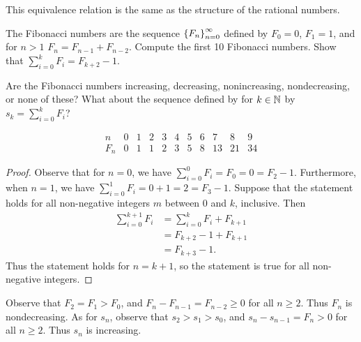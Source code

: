 \documentclass{article}
\begin{document}
  This equivalence relation is the same as the structure of the rational numbers.
  \newpage
  \begin{problem}{4}
    The Fibonacci numbers are the sequence $\left\{F_n\right\}^\infty_{n=0}$ defined by $F_0 = 0$, $F_1 = 1$, and for $n > 1$ $F_n = F_{n-1} + F_{n-2}$. Compute the first 10 Fibonacci numbers. Show that $\sum_{i=0}^{k}F_i = F_{k+2}-1$.\par
    Are the Fibonacci numbers increasing, decreasing, nonincreasing, nondecreasing, or none of these? What about the sequence defined by for $k\in\mathbb{N}$ by $s_k = \sum_{i=0}^{k}F_i$?
  \end{problem}
  \[\begin{array}{c|cccccccccc}
    n & 0 & 1 & 2 & 3 & 4 & 5 & 6 & 7 & 8 & 9 \\
    \hline
    F_n & 0 & 1 & 1 & 2 & 3 & 5 & 8 & 13 & 21 & 34
  \end{array}\]
  \begin{proof}
    Observe that for $n = 0$, we have $\sum_{i=0}^{0}F_i = F_0 = 0 = F_2 - 1$. Furthermore, when $n = 1$, we have $\sum_{i=0}^{1}F_i = 0 + 1 = 2 = F_3 - 1$. Suppose that the statement holds for all non-negative integers $m$ between $0$ and $k$, inclusive. Then
    \begin{align*}
      \sum_{i=0}^{k+1}F_i &= \sum_{i=0}^{k}F_i + F_{k+1} \\
      &= F_{k+2} - 1 + F_{k+1} \\
      &= F_{k+3} - 1.
    \end{align*}
    Thus the statement holds for $n = k+1$, so the statement is true for all non-negative integers.
  \end{proof}
  Observe that $F_2 = F_1 > F_0$, and $F_n - F_{n-1} = F_{n-2}\geq 0$ for all $n \geq 2$. Thus $F_n$ is nondecreasing. As for $s_n$, observe that $s_2 > s_1 > s_0$, and $s_n - s_{n-1} = F_n > 0$ for all $n\geq 2$. Thus $s_n$ is increasing.
\end{document}
